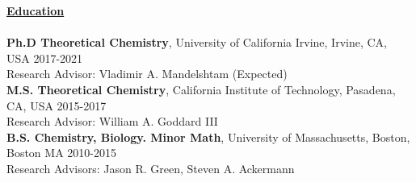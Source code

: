 \documentclass[letterpaper]{article}
\begin{document}
\vspace{0.1in}
{\large \textbf{\underline{Education}}}\\
\vspace{-0.1in}\\
\textbf{Ph.D  Theoretical Chemistry}, University of California Irvine, Irvine,
CA, USA  \hfill 2017-2021\\
Research Advisor: Vladimir A. Mandelshtam \null \hfill (Expected)\\

\textbf{M.S. Theoretical Chemistry}, California Institute of Technology, Pasadena, CA, USA  \hfill 2015-2017 \\
Research Advisor: William A. Goddard III\\

\textbf{B.S. Chemistry, Biology. Minor Math}, University of
Massachusetts, Boston, Boston MA \hfill 2010-2015\\
Research Advisors: Jason R. Green, Steven A. Ackermann\\
\end{document}
